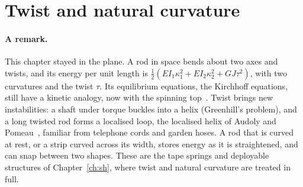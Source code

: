 \section{Twist and natural curvature}\label{sec:rd-twist}
%

\paragraph{A remark.}
This chapter stayed in the plane. A rod in space bends about two axes and twists, and its
energy per unit length is $\tfrac12(EI_1\kappa_1^2 + EI_2\kappa_2^2 + GJ\tau^2)$, with two curvatures
and the twist $\tau$. Its equilibrium equations, the Kirchhoff equations, still have a kinetic
analogy, now with the spinning top~\cite[Sections~3.6--3.8]{rd-audoly2010}. Twist brings new
instabilities: a shaft under torque buckles into a helix (Greenhill's problem), and a long
twisted rod forms a localised loop, the localised helix of Audoly and
Pomeau~\cite[Section~3.9]{rd-audoly2010}, familiar from telephone cords and garden hoses. A rod
that is curved at rest, or a strip curved across its width, stores energy as it is
straightened, and can snap between two shapes. These are the tape springs and deployable
structures of Chapter~\ref{ch:sh}, where twist and natural curvature are treated in full.

